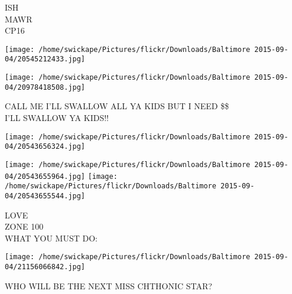 \documentclass[10pt,letterpaper]{article}
\begin{document}
ISH\\
MAWR\\
CP16
\pagebreak

\texttt{[image: /home/swickape/Pictures/flickr/Downloads/Baltimore 2015-09-04/20545212433.jpg]}

\vspace{0.25in}
\texttt{[image: /home/swickape/Pictures/flickr/Downloads/Baltimore 2015-09-04/20978418508.jpg]}

CALL ME I'LL SWALLOW ALL YA KIDS BUT I NEED \$\$\\
I'LL SWALLOW YA KIDS!!
\pagebreak

\texttt{[image: /home/swickape/Pictures/flickr/Downloads/Baltimore 2015-09-04/20543656324.jpg]}

\vspace{0.25in}
\texttt{[image: /home/swickape/Pictures/flickr/Downloads/Baltimore 2015-09-04/20543655964.jpg]}
\texttt{[image: /home/swickape/Pictures/flickr/Downloads/Baltimore 2015-09-04/20543655544.jpg]}

LOVE\\
ZONE 100\\
WHAT YOU MUST DO:
\pagebreak

\texttt{[image: /home/swickape/Pictures/flickr/Downloads/Baltimore 2015-09-04/21156066842.jpg]}

WHO WILL BE THE NEXT MISS CHTHONIC STAR?
\pagebreak
\end{document}
